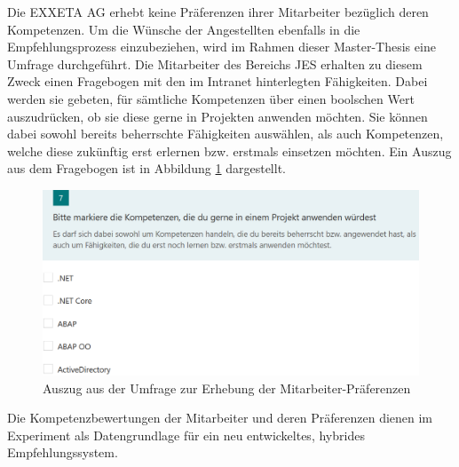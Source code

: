 Die EXXETA AG erhebt keine Präferenzen ihrer Mitarbeiter bezüglich deren Kompetenzen. Um die Wünsche der Angestellten ebenfalls in die Empfehlungsprozess einzubeziehen, wird im Rahmen dieser Master-Thesis eine Umfrage durchgeführt. Die Mitarbeiter des Bereichs \acl{JES} erhalten zu diesem Zweck einen Fragebogen mit den \anzFaehigkeiten im Intranet hinterlegten Fähigkeiten. Dabei werden sie gebeten, für sämtliche Kompetenzen über einen boolschen Wert auszudrücken, ob sie diese gerne in Projekten anwenden möchten. Sie können dabei sowohl bereits beherrschte Fähigkeiten auswählen, als auch Kompetenzen, welche diese zukünftig erst erlernen bzw. erstmals einsetzen möchten. Ein Auszug aus dem Fragebogen ist in Abbildung \ref{fig:methodik:versuchsaufbau:abb1} dargestellt.

\begin{figure}[h]
	\centering
	\includegraphics[width=1\textwidth]{gfx/Umfage_Faehigkeiten.png}
	\caption{Auszug aus der Umfrage zur Erhebung der Mitarbeiter-Präferenzen}
	\label{fig:methodik:versuchsaufbau:abb1}
\end{figure}

Die Kompetenzbewertungen der Mitarbeiter und deren Präferenzen dienen im Experiment als Datengrundlage für ein neu entwickeltes, hybrides Empfehlungssystem.

